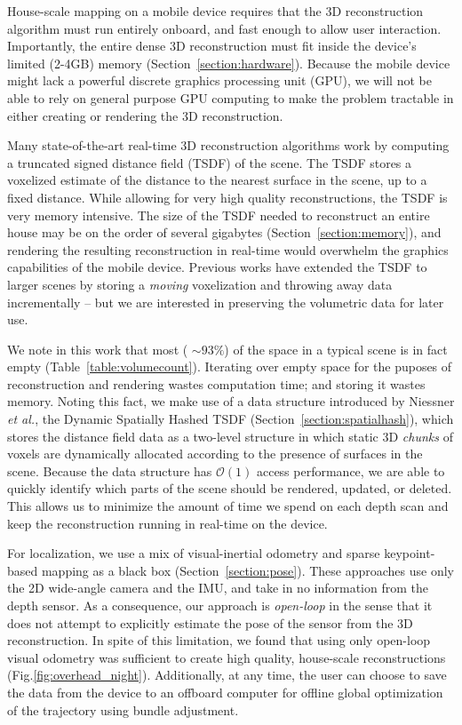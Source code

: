 \documentclass[conference]{IEEEtran}
\newcommand{\sref}[1]{Section~\ref{#1}}
\newcommand{\figref}[1]{Fig.\ref{#1}}
\newcommand{\tabref}[1]{Table~\ref{#1}}
\newcommand{\etal}{\textit{et al.}}
\begin{document}
House-scale mapping on a mobile device requires that the 3D reconstruction
algorithm must run entirely onboard, and fast enough to allow user
interaction. Importantly, the entire dense 3D reconstruction must fit inside
the device's limited (2-4GB) memory (\sref{section:hardware}). Because the mobile
device might lack a powerful discrete graphics processing unit (GPU), we will not be able to rely
on general purpose GPU computing to make the problem tractable in either
creating or rendering the 3D reconstruction.

Many state-of-the-art real-time 3D reconstruction algorithms \cite{Newcombe,
Whelan2013, WhelanLoopClose, Bylow2013, NiessnerHashing} work by computing a truncated
signed distance field (TSDF) \cite{Curless1996} of the scene. The TSDF stores a
voxelized estimate of the distance to the nearest surface in the scene, up to a
fixed distance. While allowing for very high quality reconstructions, the TSDF
is very memory intensive. The size of the TSDF needed to reconstruct an entire
house may be on the order of several gigabytes  (\sref{section:memory}), and
rendering the resulting reconstruction in real-time would overwhelm the graphics
capabilities of the mobile device. Previous works \cite{Whelan2013,
WhelanLoopClose} have extended the TSDF to larger scenes by storing a
\textit{moving} voxelization and throwing away data incrementally -- but we are
interested in preserving the volumetric data for later use.

We note in this work that most ( $\sim 93\%$) of the space in a typical scene
is in fact empty (\tabref{table:volumecount}). Iterating over empty space
for the puposes of reconstruction and rendering wastes computation time; and storing it
wastes memory. Noting this fact, we make use of a data structure introduced by
Niessner \etal \cite{NiessnerHashing}, the Dynamic Spatially Hashed
\cite{SpatialHashing} TSDF (\sref{section:spatialhash}), which stores the
distance field data as a two-level structure in which static 3D \textit{chunks}
of voxels are dynamically allocated according to the presence of surfaces in the
scene. Because the data structure has $\mathcal{O}(1)$ access performance, we
are able to quickly identify which parts of the scene should be rendered,
updated, or deleted. This allows us to minimize the amount of time we spend on
each depth scan and keep the reconstruction running in real-time on the device.

For localization, we use a mix of  visual-inertial odometry \cite{VINS} and
sparse keypoint-based mapping \cite{FastSlam} as a black box
(\sref{section:pose}). These approaches use only the 2D wide-angle camera and
the IMU, and take in no information from the depth sensor. As a consequence,
our approach is \textit{open-loop} in the sense that it does not attempt to
explicitly estimate the pose of the sensor from the 3D reconstruction. In spite
of this limitation, we found that using only open-loop visual odometry was
sufficient to create high quality, house-scale reconstructions
(\figref{fig:overhead_night}). Additionally, at any time, the user can choose to
save the data from the device to an offboard computer for offline global
optimization of the trajectory using bundle adjustment.
\end{document}
